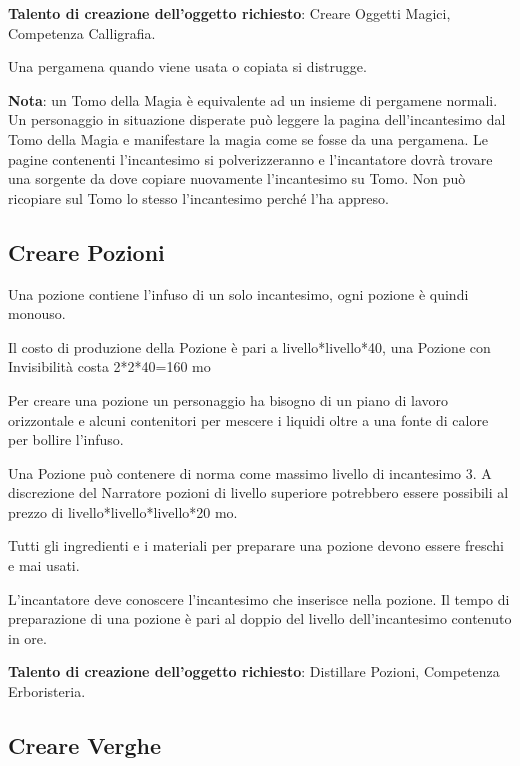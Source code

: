 \begin{multicols}{2}
\textbf{Talento di creazione dell'oggetto richiesto}: Creare Oggetti Magici, Competenza Calligrafia.

Una pergamena quando viene usata o copiata si distrugge.

\textbf{Nota}: un Tomo della Magia è equivalente ad un insieme di pergamene normali. Un personaggio in situazione disperate può leggere la pagina dell'incantesimo dal Tomo della Magia e manifestare la magia come se fosse da una pergamena. Le pagine contenenti l'incantesimo si polverizzeranno e l'incantatore dovrà trovare una sorgente da dove copiare nuovamente l'incantesimo su Tomo. Non può ricopiare sul Tomo lo stesso l'incantesimo perché l'ha appreso. 

\subsection{Creare Pozioni}\label{crearepozioni}\hypertarget{crearepozioni}{}

Una pozione contiene l'infuso di un solo incantesimo, ogni pozione è quindi monouso.

\medskip

Il costo di produzione della Pozione è pari a livello*livello*40, una Pozione con Invisibilità costa 2*2*40=160 mo

\medskip

Per creare una pozione un personaggio ha bisogno di un piano di lavoro orizzontale e alcuni contenitori per mescere i liquidi oltre a una fonte di calore per bollire l'infuso.

Una Pozione può contenere di norma come massimo livello di incantesimo 3. A discrezione del Narratore pozioni di livello superiore potrebbero essere possibili al prezzo di livello*livello*livello*20 mo.

Tutti gli ingredienti e i materiali per preparare una pozione devono essere freschi e mai usati.

L'incantatore deve conoscere l'incantesimo che inserisce nella pozione. Il tempo di preparazione di una pozione è pari al doppio del livello dell'incantesimo contenuto in ore.

\textbf{Talento di creazione dell'oggetto richiesto}: Distillare Pozioni, Competenza Erboristeria.

\subsection{Creare Verghe}\label{creareverghe}


\end{multicols}
